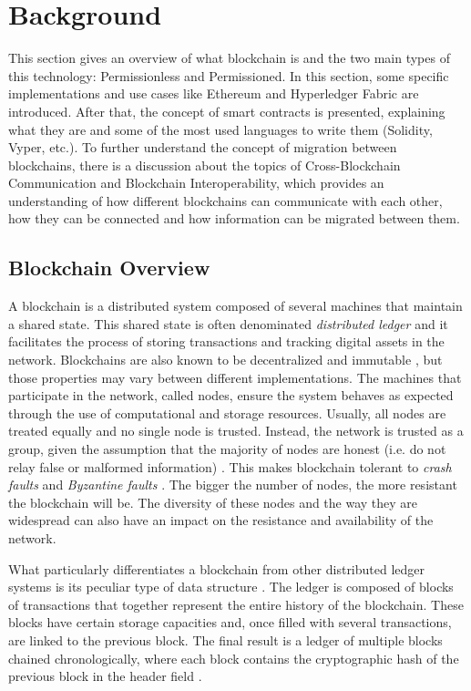 \documentclass[runningheads]{llncs}
\begin{document}
\section{Background} \label{background}

This section gives an overview of what blockchain is and the two main types of this technology: Permissionless and Permissioned. In this section, some specific implementations and use cases like Ethereum and Hyperledger Fabric are introduced. After that, the concept of smart contracts is presented, explaining what they are and some of the most used languages to write them (Solidity, Vyper, etc.). To further understand the concept of migration between blockchains, there is a discussion about the topics of Cross-Blockchain Communication and Blockchain Interoperability, which provides an understanding of how different blockchains can communicate with each other, how they can be connected and how information can be migrated between them.


\subsection{Blockchain Overview}
A blockchain is a distributed system composed of several machines that maintain a shared state. This shared state is often denominated \textit{distributed ledger} and it facilitates the process of storing transactions and tracking digital assets in the network. Blockchains are also known to be decentralized and immutable \cite{nakamoto_2008}, but those properties may vary between different implementations. The machines that participate in the network, called nodes, ensure the system behaves as expected through the use of computational and storage resources. Usually, all nodes are treated equally and no single node is trusted. Instead, the network is trusted as a group, given the assumption that the majority of nodes are honest (i.e. do not relay false or malformed information) \cite{nakamoto_2008}. This makes blockchain tolerant to \textit{crash faults} and \textit{Byzantine faults} \cite{survey}. The bigger the number of nodes, the more resistant the blockchain will be. The diversity of these nodes and the way they are widespread can also have an impact on the resistance and availability of the network.

What particularly differentiates a blockchain from other distributed ledger systems is its peculiar type of data structure \cite{video}. The ledger is composed of blocks of transactions that together represent the entire history of the blockchain. These blocks have certain storage capacities and, once filled with several transactions, are linked to the previous block. The final result is a ledger of multiple blocks chained chronologically, where each block contains the cryptographic hash of the previous block in the header field \cite{survey}.
\end{document}
